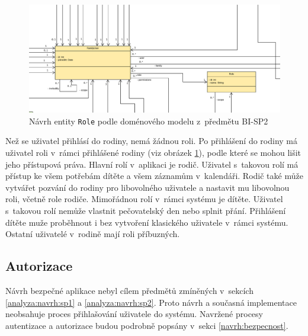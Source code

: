         \begin{figure}\centering
	        \includegraphics[width=1.0\textwidth]{pdfs/Role1}
	        \caption[Návrh \texttt{Role}]{Návrh entity \texttt{Role} podle doménového modelu z~předmětu BI-SP2}\label{image:Role1}
        \end{figure}
        Než se uživatel přihlásí do rodiny, nemá žádnou roli. Po přihlášení do rodiny má uživatel roli v~rámci přihlášené rodiny (viz obrázek \ref{image:Role1}), podle které se mohou lišit jeho přístupová práva. Hlavní rolí v~aplikaci je rodič. Uživatel s~takovou rolí má přístup ke všem potřebám dítěte a všem záznamům v~kalendáři. Rodič také může vytvářet pozvání do rodiny pro libovolného uživatele a nastavit mu libovolnou roli, včetně role rodiče. Mimořádnou rolí v~rámci systému je dítěte. 
        Uživatel s~takovou rolí nemůže vlastnit pečovatelský den nebo splnit přání. Přihlášení dítěte muže proběhnout i bez vytvoření klasického uživatele v~rámci systému. Ostatní uživatelé v~rodině mají roli příbuzných. 
    
    \subsection{Autorizace}
        Návrh bezpečné aplikace nebyl cílem předmětů zmíněných v~sekcích \ref{analyza:navrh:sp1} a \ref{analyza:navrh:sp2}. Proto návrh a současná implementace neobsahuje proces přihlašování uživatele do systému. Navržené procesy autentizace a autorizace budou podrobně popsány v~sekci \ref{navrh:bezpecnost}.
        
